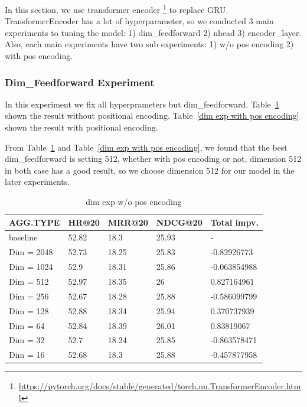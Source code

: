 \documentclass{article}
\begin{document}
In this section, we use transformer encoder
\footnote{\url{https://pytorch.org/docs/stable/generated/torch.nn.TransformerEncoder.html}}
to replace GRU.
TransformerEncoder has a lot of hyperparameter, so we conducted
3 main experiments to tuning the model:
1) dim\_feedforward 2) nhead 3) encoder\_layer.
Also, each main experiments have two sub experiments:
1) w/o pos encoding 2) with pos encoding.

\subsubsection{Dim\_Feedforward Experiment}

In this experiment we fix all hyperprameters but dim\_feedforward.
Table~\ref{dim exp w/o pos encoding} shown the result without
positional encoding.
Table~\ref{dim exp with pos encoding} shown the result with positional encoding.

From Table~\ref{dim exp w/o pos encoding} and Table~\ref{dim exp with pos encoding},
we found that the best dim\_feedforward is setting 512,
whether with pos encoding or not, dimension 512 in both case has a good result,
so we choose dimension 512 for our model in the later experiments.

\begin{table}
    \caption{dim exp w/o pos encoding}
    \label{dim exp w/o pos encoding}
    \centering
    \begin{tabular}{lllll}
        \toprule
        AGG.TYPE   & HR@20 & MRR@20 & NDCG@20 & Total impv.  \\
        \midrule
        baseline   & 52.82 & 18.3   & 25.93   & -            \\
        Dim = 2048 & 52.73 & 18.25  & 25.83   & -0.82926773  \\
        Dim = 1024 & 52.9  & 18.31  & 25.86   & -0.063854988 \\
        Dim = 512  & 52.97 & 18.35  & 26      & 0.827164961  \\
        Dim = 256  & 52.67 & 18.28  & 25.88   & -0.586099799 \\
        Dim = 128  & 52.88 & 18.34  & 25.94   & 0.370737939  \\
        Dim = 64   & 52.84 & 18.39  & 26.01   & 0.83819067   \\
        Dim = 32   & 52.7  & 18.24  & 25.85   & -0.863578471 \\
        Dim = 16   & 52.68 & 18.3   & 25.88   & -0.457877958 \\
        \bottomrule
    \end{tabular}
\end{table}
\end{document}
